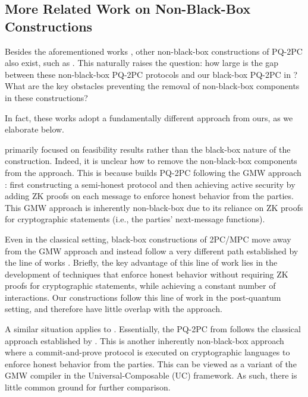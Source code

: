 \subsection{More Related Work on Non-Black-Box Constructions}


Besides the aforementioned works \cite{EC:ABGKM21,FOCS:LPY23,goyal2023concurrent}, other non-black-box constructions of PQ-2PC also exist, such as \cite{AFRICACRYPT:LunNie11,C:HalSmiSon11}. This naturally raises the question: how large is the gap between these non-black-box PQ-2PC protocols and our black-box PQ-2PC in ? What are the key obstacles preventing the removal of non-black-box components in these constructions?

In fact, these works adopt a fundamentally different approach from ours, as we elaborate below.


\cite{AFRICACRYPT:LunNie11} primarily focused on feasibility results rather than the black-box nature of the construction. Indeed, it is unclear how to remove the non-black-box components from the \cite{AFRICACRYPT:LunNie11} approach. This is because \cite{AFRICACRYPT:LunNie11} builds PQ-2PC following the GMW approach \cite{STOC:GolMicWig87}: first constructing a semi-honest protocol and then achieving active security by adding ZK proofs on each message to enforce honest behavior from the parties. This GMW approach is inherently non-black-box due to its reliance on ZK proofs for cryptographic statements (i.e., the parties' next-message functions).

Even in the classical setting, black-box constructions of 2PC/MPC move away from the GMW approach and instead follow a very different path established by the line of works \cite{C:IshPraSah08,TCC:PasWee09,TCC:CDMW09,TCC:Haitner08,STOC:IKLP06,FOCS:Wee10,STOC:Goyal11}. Briefly, the key advantage of this line of work lies in the development of techniques that enforce honest behavior without requiring ZK proofs for cryptographic statements, while achieving a constant number of interactions. Our constructions follow this line of work in the post-quantum setting, and therefore have little overlap with the \cite{AFRICACRYPT:LunNie11} approach.

A similar situation applies to \cite{C:HalSmiSon11}. Essentially, the PQ-2PC from \cite{C:HalSmiSon11} follows the classical approach established by \cite{STOC:CLOS02}. This is another inherently non-black-box approach where a commit-and-prove protocol is executed on cryptographic languages to enforce honest behavior from the parties. This can be viewed as a variant of the GMW compiler in the Universal-Composable (UC) framework. As such, there is little common ground for further comparison.



